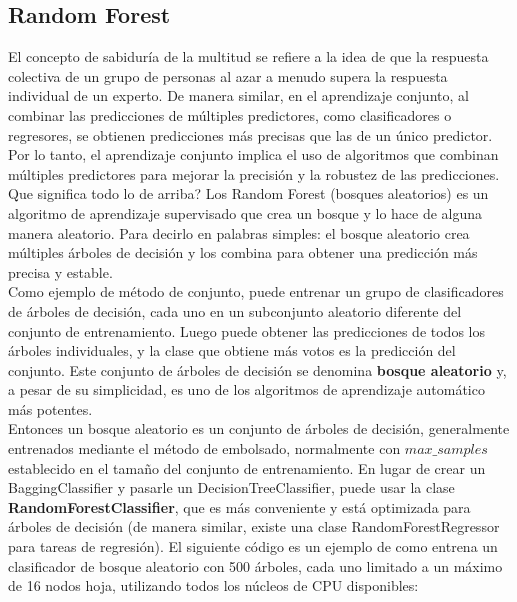 \subsection{Random Forest}

El concepto de sabiduría de la multitud se refiere a la idea de que la respuesta colectiva 
de un grupo de personas al azar a menudo supera la respuesta individual de un experto. 
De manera similar, en el aprendizaje conjunto, al combinar las predicciones de múltiples 
predictores, como clasificadores o regresores, se obtienen predicciones más precisas que 
las de un único predictor. Por lo tanto, el aprendizaje conjunto implica el uso de algoritmos 
que combinan múltiples predictores para mejorar la precisión y la robustez de las predicciones.\\ 

Que significa todo lo de arriba? Los Random Forest (bosques aleatorios) es un algoritmo de 
aprendizaje supervisado que crea un bosque y lo hace de alguna manera aleatorio. Para decirlo 
en palabras simples: el bosque aleatorio crea múltiples árboles de decisión y los combina para 
obtener una predicción más precisa y estable. \cite{Machinelearning}\\

Como ejemplo de método de conjunto, puede entrenar un grupo de clasificadores de árboles de 
decisión, cada uno en un subconjunto aleatorio diferente del conjunto de entrenamiento. 
Luego puede obtener las predicciones de todos los árboles individuales, y la clase que obtiene 
más votos es la predicción del conjunto. Este conjunto de árboles de decisión se denomina 
\textbf{bosque aleatorio} y, a pesar de su simplicidad, es uno de los algoritmos de 
aprendizaje automático más potentes. \cite{géron2022hands}\\ 

Entonces un bosque aleatorio es un conjunto de árboles de decisión, generalmente entrenados 
mediante el método de embolsado, normalmente con $max\_samples$ establecido en el tamaño del 
conjunto de entrenamiento. En lugar de crear un BaggingClassifier y pasarle un 
DecisionTreeClassifier, puede usar la clase \textbf{RandomForestClassifier}, que es más 
conveniente y está optimizada para árboles de decisión (de manera similar, existe una clase 
RandomForestRegressor para tareas de regresión). El siguiente código es un ejemplo de como  
entrena un clasificador de bosque aleatorio con 500 árboles, cada uno limitado a un máximo de 
16 nodos hoja, utilizando todos los núcleos de CPU disponibles:\cite{géron2022hands}\\ 

